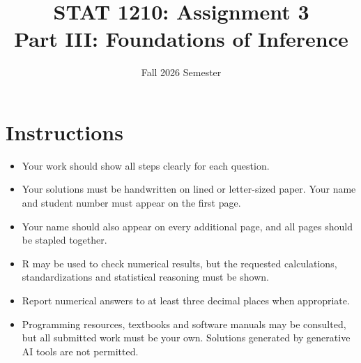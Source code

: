 \documentclass[10pt,letterpaper]{article}
\title{STAT 1210: Assignment 3\\[4pt]\large Part III: Foundations of Inference}
\author{Fall 2026 Semester}
\date{}
\begin{document}
\maketitle

\section*{Instructions}
\begin{itemize}
\item Your work should show all steps clearly for each question.
\item Your solutions must be handwritten on lined or letter-sized paper. Your name and student number must appear on the first page.
\item Your name should also appear on every additional page, and all pages should be stapled together.
\item R may be used to check numerical results, but the requested calculations, standardizations and statistical reasoning must be shown.
\item Report numerical answers to at least three decimal places when appropriate.
\item Programming resources, textbooks and software manuals may be consulted, but all submitted work must be your own. Solutions generated by generative AI tools are not permitted.
\end{itemize}

\newpage

\end{document}
